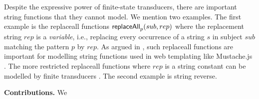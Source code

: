 
Despite the expressive power of finite-state transducers, there are important
string functions that they cannot model. We mention two examples. The first 
example is 
the 
replaceall functions $\mathsf{replaceAll}_p(sub,rep)$ where the replacement string 
$rep$ is a \emph{variable}, i.e., replacing every occurrence of a string $s$ in
subject $sub$ matching the pattern $p$ by $rep$. As argued in \cite{CCHLW18},
such replaceall
functions are important for modelling string functions used in web 
templating like Mustache.js \cite{Mustache}. The more restricted replaceall
functions where $rep$ is a string constant can be modelled by finite 
transducers \cite{LB16}.
The second example is string reverse.



%
%


\smallskip
\noindent
\textbf{Contributions.} We



